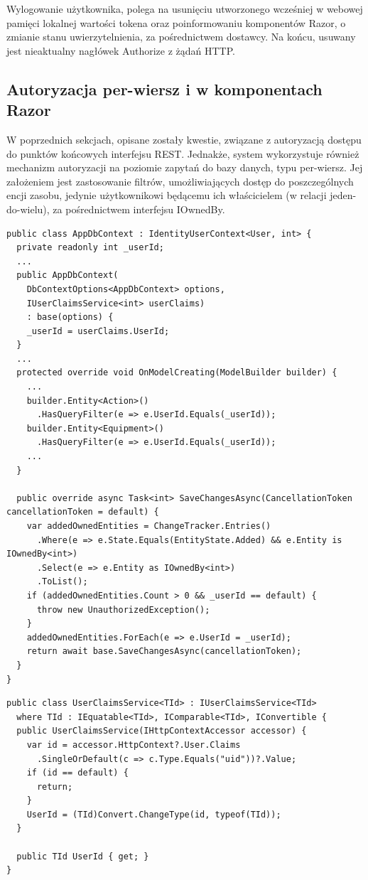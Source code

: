 Wylogowanie użytkownika, polega na usunięciu utworzonego wcześniej w webowej pamięci lokalnej wartości tokena oraz poinformowaniu komponentów Razor, o zmianie stanu uwierzytelnienia, za pośrednictwem dostawcy. Na końcu, usuwany jest nieaktualny nagłówek Authorize z żądań HTTP.

\subsection{Autoryzacja per-wiersz i w komponentach Razor}

W poprzednich sekcjach, opisane zostały kwestie, związane z autoryzacją dostępu do punktów końcowych interfejsu REST. Jednakże, system wykorzystuje również mechanizm autoryzacji na poziomie zapytań do bazy danych, typu per-wiersz. Jej założeniem jest zastosowanie filtrów, umożliwiających dostęp do poszczególnych encji zasobu, jedynie użytkownikowi będącemu ich właścicielem (w relacji jeden-do-wielu), za pośrednictwem interfejsu IOwnedBy.

\begin{lstlisting}[language=CSharp, caption={Konfiguracja autoryzacji per-wiersz w bazie danych}, label=lst:dbContext_perRowProtection]
public class AppDbContext : IdentityUserContext<User, int> {
  private readonly int _userId;
  ...
  public AppDbContext(
    DbContextOptions<AppDbContext> options,
    IUserClaimsService<int> userClaims)
    : base(options) {
    _userId = userClaims.UserId;
  }
  ...
  protected override void OnModelCreating(ModelBuilder builder) {
    ...
    builder.Entity<Action>()
      .HasQueryFilter(e => e.UserId.Equals(_userId));
    builder.Entity<Equipment>()
      .HasQueryFilter(e => e.UserId.Equals(_userId));
    ...
  }

  public override async Task<int> SaveChangesAsync(CancellationToken cancellationToken = default) {
    var addedOwnedEntities = ChangeTracker.Entries()
      .Where(e => e.State.Equals(EntityState.Added) && e.Entity is IOwnedBy<int>)
      .Select(e => e.Entity as IOwnedBy<int>)
      .ToList();
    if (addedOwnedEntities.Count > 0 && _userId == default) {
      throw new UnauthorizedException();
    }
    addedOwnedEntities.ForEach(e => e.UserId = _userId);
    return await base.SaveChangesAsync(cancellationToken);
  }
}
\end{lstlisting}

\begin{lstlisting}[language=CSharp, caption={Serwis twierdzeń użytkownika, udostępniający klientom klucz główny uwierzytelnionego użytkownika}, label=lst:userClaimsService]
public class UserClaimsService<TId> : IUserClaimsService<TId>
  where TId : IEquatable<TId>, IComparable<TId>, IConvertible {
  public UserClaimsService(IHttpContextAccessor accessor) {
    var id = accessor.HttpContext?.User.Claims
      .SingleOrDefault(c => c.Type.Equals("uid"))?.Value;
    if (id == default) {
      return;
    }
    UserId = (TId)Convert.ChangeType(id, typeof(TId));
  }

  public TId UserId { get; }
}
\end{lstlisting}

